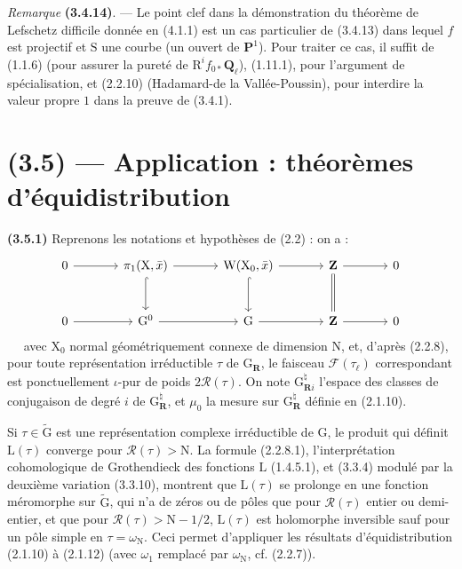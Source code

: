 \documentclass[11pt,leqno]{article}
\newcommand{\Page}[1]{\ifvmode\noindent\else\unskip\ \fi{\footnotesize\textcolor{gray}{[p.\,#1]}}\ \ignorespaces}
\begin{document}
\textit{Remarque} \textbf{(3.4.14)}. — Le point clef dans la démonstration du théorème de Lefschetz difficile donnée en (4.1.1) est un cas particulier de (3.4.13) dans lequel \(f\) est projectif et \(\mathrm S\) une courbe (un ouvert de \(\mathbf P^1\)). Pour traiter ce cas, il suffit de (1.1.6) (pour assurer la pureté de \(\mathrm R^if_{0*}\mathbf Q_\ell\)), (1.11.1), pour l’argument de spécialisation, et (2.2.10) (Hadamard-de la Vallée-Poussin), pour interdire la valeur propre \(1\) dans la preuve de (3.4.1).

\section*{(3.5) — Application : théorèmes d’équidistribution}

\textbf{(3.5.1)} Reprenons les notations et hypothèses de (2.2) : on a :
\[
\begin{tikzcd}[column sep=large,row sep=large]
0 \arrow[r] &
\pi_1(\mathrm X,\bar x) \arrow[r] \arrow[d,hook] &
\mathrm W(\mathrm X_0,\bar x) \arrow[r] \arrow[d,hook] &
\mathbf Z \arrow[r] \arrow[d,equal] & 0 \\
0 \arrow[r] &
\mathrm G^0 \arrow[r] &
\mathrm G \arrow[r] &
\mathbf Z \arrow[r] & 0
\end{tikzcd}
\]
\Page{211}
avec \(\mathrm X_0\) normal géométriquement connexe de dimension \(\mathrm N\), et, d’après (2.2.8), pour toute représentation irréductible \(\tau\) de \(\mathrm G_{\mathbf R}\), le faisceau \(\mathscr F(\tau_\ell)\) correspondant est ponctuellement \(\iota\)-pur de poids \(2\mathscr R(\tau)\). On note \(\mathrm G_{\mathbf R i}^{\natural}\) l’espace des classes de conjugaison de degré \(i\) de \(\mathrm G_{\mathbf R}^{\natural}\), et \(\mu_0\) la mesure sur \(\mathrm G_{\mathbf R}^{\natural}\) définie en (2.1.10).

Si \(\tau\in\widetilde{\mathrm G}\) est une représentation complexe irréductible de \(\mathrm G\), le produit qui définit \(\mathrm L(\tau)\) converge pour \(\mathscr R(\tau)>\mathrm N\). La formule (2.2.8.1), l’interprétation cohomologique de Grothendieck des fonctions \(\mathrm L\) (1.4.5.1), et (3.3.4) modulé par la deuxième variation (3.3.10), montrent que \(\mathrm L(\tau)\) se prolonge en une fonction méromorphe sur \(\widetilde{\mathrm G}\), qui n’a de zéros ou de pôles que pour \(\mathscr R(\tau)\) entier ou demi-entier, et que pour \(\mathscr R(\tau)>\mathrm N-1/2\), \(\mathrm L(\tau)\) est holomorphe inversible sauf pour un pôle simple en \(\tau=\omega_{\mathrm N}\). Ceci permet d’appliquer les résultats d’équidistribution (2.1.10) à (2.1.12) (avec \(\omega_1\) remplacé par \(\omega_{\mathrm N}\), cf. (2.2.7)).
\end{document}
